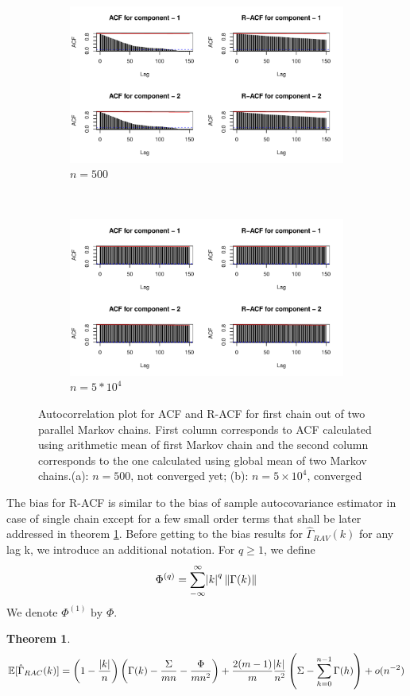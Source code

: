 \documentclass[12pt]{article}
\newtheorem{theorem}{Theorem}
\begin{document}
\begin{figure}
\begin{subfigure}{\textwidth}
  \centering
  \includegraphics[width=.8\linewidth]{var-acf_5e2.pdf}
  \caption{$n = 500$}
  \label{subfig:acf-500}
\end{subfigure}\\
\begin{subfigure}{\textwidth}
  \centering
  \includegraphics[width=.8\linewidth]{var-acf_5e4.pdf}
  \caption{$n = 5*10^4$}
  \label{subfig:acf-5e4}
\end{subfigure}
\caption{Autocorrelation plot for ACF and R-ACF for first chain out of two parallel Markov chains. First column corresponds to ACF calculated using arithmetic mean of first Markov chain and the second column corresponds to the one calculated using global mean of two Markov chains.(a): $n = 500$, not converged yet; (b): $n = 5 \times 10^4$, converged}
\label{fig:var_acf_ccf}
\end{figure}

The bias for R-ACF is similar to the bias of sample autocovariance estimator in case of single chain except for a few small order terms that shall be later addressed in theorem \ref{th:RAC_expec}. Before getting to the bias results for $\hat{\Gamma}_{RAV}(k)$ for any lag k, we introduce an additional notation. For $q \geq 1$, we define
\[
\Phi^{(q)} = \sum\limits_{-\infty}^{\infty}\abs{k}^q \|\Gamma(k)\|
\]
We denote $\Phi^{(1)} \textrm{ by } \Phi$. 
\begin{theorem} \label{th:RAC_expec}
   \[
   \mathbb{E}[\hat{\Gamma}_{RAC}(k)] = \left(1- \dfrac{|k|}{n}\right)\left(\Gamma(k) - \dfrac{\Sigma}{mn} - \dfrac{\Phi}{mn^2}\right)  + \dfrac{2(m-1)}{m}\dfrac{\abs{k}}{n^2} \left(\Sigma - \sum_{h=0}^{n-1}\Gamma(h)\right) + o(n^{-2})
   \]
\end{theorem}
\end{document}
